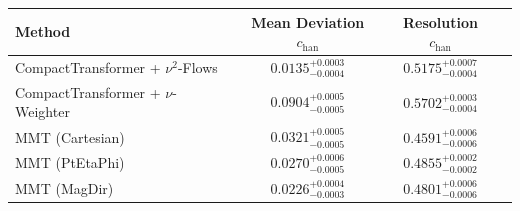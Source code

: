     \begin{tabular}{lccc}
        \toprule
        Method & Mean Deviation $c_{\text{han}}$ & Resolution $c_{\text{han}}$ \\
        \midrule
        CompactTransformer + $\nu^2$-Flows & $0.0135^{+0.0003}_{-0.0004}$ & $0.5175^{+0.0007}_{-0.0004}$ \\
        CompactTransformer + $\nu$-Weighter & $0.0904^{+0.0005}_{-0.0005}$ & $0.5702^{+0.0003}_{-0.0004}$ \\
        MMT (Cartesian) & $0.0321^{+0.0005}_{-0.0005}$ & $0.4591^{+0.0006}_{-0.0006}$ \\
        MMT (PtEtaPhi) & $0.0270^{+0.0006}_{-0.0005}$ & $0.4855^{+0.0002}_{-0.0002}$ \\
        MMT (MagDir) & $0.0226^{+0.0004}_{-0.0003}$ & $0.4801^{+0.0006}_{-0.0006}$ \\
        \bottomrule
    \end{tabular}